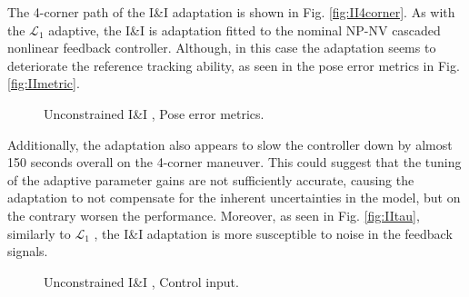 The 4-corner path of the I\&I adaptation is shown in Fig. \ref{fig:II4corner}. As with the $\mathcal{L}_1$ adaptive, the I\&I is adaptation fitted to the nominal NP-NV cascaded nonlinear feedback controller. Although, in this case the adaptation seems to deteriorate the reference tracking ability, as seen in the pose error metrics in Fig. \ref{fig:IImetric}.

\begin{figure}[!h]
    \centering
    \caption{Unconstrained I\&I , Pose error metrics.}
\end{figure}\label{fig:IImetric}

Additionally, the adaptation also appears to slow the controller down by almost 150 seconds overall on the 4-corner maneuver. This could suggest that the tuning of the adaptive parameter gains are not sufficiently accurate, causing the adaptation to not compensate for the inherent uncertainties in the model, but on the contrary worsen the performance. Moreover, as seen in Fig. \ref{fig:IItau}, similarly to $\mathcal{L}_1$ , the I\&I adaptation is more susceptible to noise in the feedback signals.  

\begin{figure}[!h]
    \centering
    \caption{Unconstrained I\&I , Control input.}
\end{figure}\label{fig:IItau}

